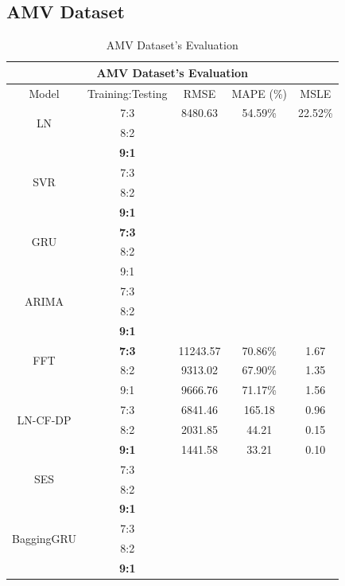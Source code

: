 \documentclass{ieeeojies}
\begin{document}
\subsection{AMV Dataset} 
\begin{table}[H]
    \centering
    \begin{tabular}{|c|c|c|c|c|}
         \hline
         \multicolumn{5}{|c|}{\textbf{AMV Dataset's Evaluation}}\\
         \hline
         \centering Model & Training:Testing & RMSE & MAPE (\%) & MSLE\\
         \hline
         \multirow{2}{*}{LN} & 7:3 & 8480.63 & 54.59\% & 22.52\% \\ & 8:2 & & & \\ & \textbf{9:1} & & & \\
         \hline
         \multirow{2}{*}{SVR} & 7:3&&&\\ & 8:2&&&\\ & \textbf{9:1} & & & \\
         \hline
         \multirow{2}{*}{GRU} & \textbf{7:3}	& & & \\ & 8:2 & & & \\ & 9:1 & & & \\
         \hline
         \multirow{2}{*}{ARIMA} & 7:3 &  &  & \\ & 8:2 &  & & \\ & \textbf{9:1} & & & \\
         \hline
         \multirow{2}{*}{FFT}& \textbf{7:3}	& 11243.57& 70.86\%& 1.67\\ & 8:2 & 9313.02& 67.90\%& 1.35\\ & 9:1 & 9666.76& 71.17\%& 1.56\\
         \hline
         \multirow{2}{*}{LN-CF-DP} & 7:3 & 6841.46 & 165.18 & 0.96 \\ & 8:2 &2031.85	& 44.21 & 0.15 \\ & \textbf{9:1} &1441.58&33.21& 0.10\\
         \hline
         \multirow{2}{*}{SES} & 7:3 & & & \\ & 8:2 & && \\ & \textbf{9:1} &  	&	& 	\\
         \hline
         \multirow{2}{*}{BaggingGRU} & 7:3 & &  &  \\ & 8:2 & &  &  \\ & \textbf{9:1} & & & \\
         \hline
    \end{tabular}
    \caption{AMV Dataset's Evaluation}
    \label{vcbresult}
\end{table}
\end{document}
